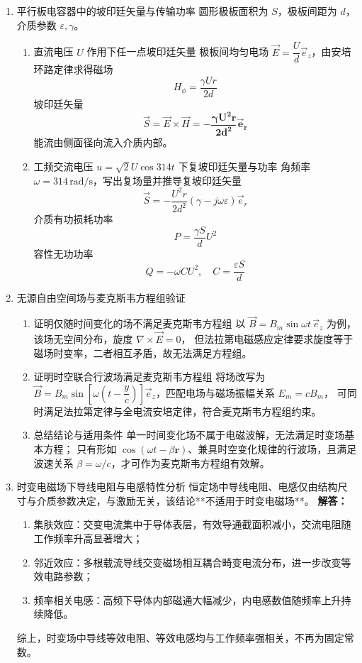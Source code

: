\begin{enumerate}[label=\arabic*.]
\item 平行板电容器中的坡印廷矢量与传输功率
圆形极板面积为 \(S\)，极板间距为 \(d\)，介质参数 \(\varepsilon,\gamma\)。
\begin{enumerate}[label=(\arabic*)]
    \item 直流电压 \(U\) 作用下任一点坡印廷矢量
    极板间均匀电场 \(\vec{E}=\dfrac{U}{d}\vec{e}_z\)，由安培环路定律求得磁场
    \[
    H_\phi = \frac{\gamma U r}{2d}
    \]
    坡印廷矢量
    \[
    \vec{S} = \vec{E}\times\vec{H} = \boldsymbol{-\frac{\gamma U^2 r}{2d^2}\vec{e}_r}
    \]
    能流由侧面径向流入介质内部。

    \item 工频交流电压 \(u=\sqrt{2}U\cos314t\) 下复坡印廷矢量与功率
    角频率 \(\omega=314\,\text{rad/s}\)，写出复场量并推导复坡印廷矢量
    \[
    \dot{\vec{S}} = -\frac{U^2 r}{2d^2}(\gamma-j\omega\varepsilon)\vec{e}_r
    \]
    介质有功损耗功率
    \[
    P = \frac{\gamma S}{d}U^2
    \]
    容性无功功率
    \[
    Q = -\omega C U^2,\quad C=\frac{\varepsilon S}{d}
    \]
\end{enumerate}
\vspace{1em}

\item 无源自由空间场与麦克斯韦方程组验证
\begin{enumerate}[label=(\arabic*)]
    \item 证明仅随时间变化的场不满足麦克斯韦方程组
    以 \(\vec{B}=B_m\sin\omega t\,\vec{e}_z\) 为例，该场无空间分布，旋度 \(\nabla\times\vec{E}=0\)，
    但法拉第电磁感应定律要求旋度等于磁场时变率，二者相互矛盾，故无法满足方程组。

    \item 证明时空联合行波场满足麦克斯韦方程组
    将场改写为 \(\vec{B}=B_m\sin\left[\omega\left(t-\dfrac{y}{c}\right)\right]\vec{e}_z\)，匹配电场与磁场振幅关系 \(E_m=cB_m\)，
    可同时满足法拉第定律与全电流安培定律，符合麦克斯韦方程组约束。

    \item 总结结论与适用条件
    单一时间变化场不属于电磁波解，无法满足时变场基本方程；
    只有形如 \(\cos(\omega t-\beta \boldsymbol{r})\)、兼具时空变化规律的行波场，且满足波速关系 \(\beta=\omega/c\)，才可作为麦克斯韦方程组有效解。
\end{enumerate}
\vspace{1em}

\item 时变电磁场下导线电阻与电感特性分析
恒定场中导线电阻、电感仅由结构尺寸与介质参数决定，与激励无关，该结论**不适用于时变电磁场**。
\textbf{解答：}
\begin{enumerate}
    \item 集肤效应：交变电流集中于导体表层，有效导通截面积减小，交流电阻随工作频率升高显著增大；
    \item 邻近效应：多根载流导线交变磁场相互耦合畸变电流分布，进一步改变等效电路参数；
    \item 频率相关电感：高频下导体内部磁通大幅减少，内电感数值随频率上升持续降低。
\end{enumerate}
综上，时变场中导线等效电阻、等效电感均与工作频率强相关，不再为固定常数。

\end{enumerate}